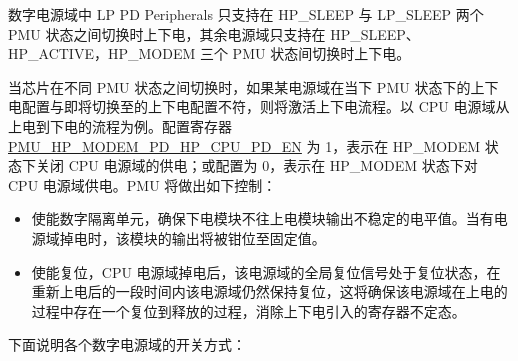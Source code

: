 \documentclass[main\_\_CN.tex]{subfiles}
\begin{document}
数字电源域中 LP PD Peripherals 只支持在 HP\_SLEEP 与 LP\_SLEEP 两个 PMU 状态之间切换时上下电，其余电源域只支持在 HP\_SLEEP、HP\_ACTIVE，HP\_MODEM 三个 PMU 状态间切换时上下电。

当芯片在不同 PMU 状态之间切换时，如果某电源域在当下 PMU 状态下的上下电配置与即将切换至的上下电配置不符，则将激活上下电流程。以 CPU 电源域从上电到下电的流程为例。配置寄存器 \hyperref[fielddesc:PMUHPMODEMPDHPCPUPDEN]{PMU\_HP\_MODEM\_PD\_HP\_CPU\_PD\_EN} 为 1，表示在 HP\_MODEM 状态下关闭 CPU 电源域的供电；或配置为 0，表示在 HP\_MODEM 状态下对 CPU 电源域供电。PMU 将做出如下控制：

\begin{itemize}

\item 使能数字隔离单元，确保下电模块不往上电模块输出不稳定的电平值。当有电源域掉电时，该模块的输出将被钳位至固定值。

\item 使能复位，CPU 电源域掉电后，该电源域的全局复位信号处于复位状态，在重新上电后的一段时间内该电源域仍然保持复位，这将确保该电源域在上电的过程中存在一个复位到释放的过程，消除上下电引入的寄存器不定态。

\end{itemize}

下面说明各个数字电源域的开关方式：
\end{document}
